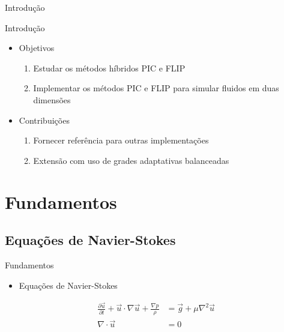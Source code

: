 \documentclass[aspectratio=169,xcolor=dvipsnames]{beamer}
\begin{document}
\begin{frame}{Introdução}
\end{frame}

\begin{frame}{Introdução}

\begin{itemize}
    \item Objetivos
    \begin{enumerate}
        \item Estudar os métodos híbridos PIC e FLIP
        \item Implementar os métodos PIC e FLIP para simular fluidos em duas dimensões
    \end{enumerate}
    \item Contribuições
    \begin{enumerate}
        \item Fornecer referência para outras implementações
        \item Extensão com uso de grades adaptativas balanceadas
    \end{enumerate}
\end{itemize}

\end{frame}



\section{Fundamentos}

\subsection{Equações de Navier-Stokes}
\begin{frame}{Fundamentos}
    \begin{itemize}[<+->]
        \item Equações de Navier-Stokes
    \end{itemize}
    
    {
        \begin{align}
            \frac{\partial \Vec{u}}{\partial t} + \Vec{u} \cdot \nabla \Vec{u} + \frac{\nabla p}{\rho} & = \Vec{g} + \mu \nabla^2 \Vec{u} \label{eq:momentum}\\
            \nabla \cdot \Vec{u} & = 0 \label{eq:pressure}
        \end{align}
    }
\end{frame}
\end{document}

